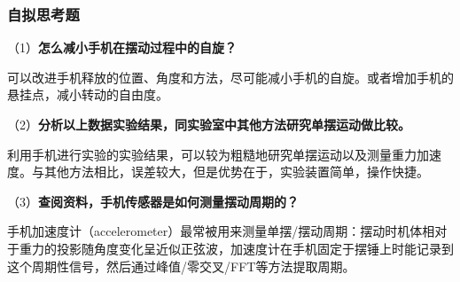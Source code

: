 \documentclass[12pt]{article}
\begin{document}
\subsubsection{自拟思考题}
（1）\textbf{怎么减小手机在摆动过程中的自旋？}

可以改进手机释放的位置、角度和方法，尽可能减小手机的自旋。或者增加手机的悬挂点，减小转动的自由度。

（2）\textbf{分析以上数据实验结果，同实验室中其他方法研究单摆运动做比较。}

利用手机进行实验的实验结果，可以较为粗糙地研究单摆运动以及测量重力加速度。与其他方法相比，误差较大，但是优势在于，实验装置简单，操作快捷。

（3）\textbf{查阅资料，手机传感器是如何测量摆动周期的？}

手机加速度计（accelerometer）最常被用来测量单摆/摆动周期：摆动时机体相对于重力的投影随角度变化呈近似正弦波，加速度计在手机固定于摆锤上时能记录到这个周期性信号，然后通过峰值/零交叉/FFT等方法提取周期。
\end{document}
